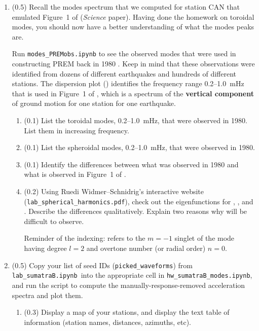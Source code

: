 \documentclass[11pt,titlepage,fleqn]{article}
\newcommand{\tfilemodes}{{\tt hw\_sumatraB\_modes.ipynb}}
\newcommand{\tfilelab}{{\tt lab\_sumatraB.ipynb}}
\begin{document}
\begin{enumerate}
\item (0.5) Recall the modes spectrum that we computed for station CAN that emulated Figure~1 of \citet{Park2005} ({\em Science} paper). Having done the homework on toroidal modes, you should now have a better understanding of what the modes peaks are.

Run \verb+modes_PREMobs.ipynb+ to see the observed modes that were used in constructing PREM back in 1980 \citep{PREM}. Keep in mind that these observations were identified from dozens of different earthquakes and hundreds of different stations.
The dispersion plot () identifies the frequency range 0.2--1.0~mHz that is used in Figure~1 of \citet{Park2005}, which is a spectrum of the {\bf vertical component} of ground motion for one station for one earthquake.
%
\begin{enumerate}
\item (0.1) List the toroidal modes, 0.2--1.0~mHz, that were observed in 1980. \\
List them in increasing frequency.
\item (0.1) List the spheroidal modes, 0.2--1.0~mHz, that were observed in 1980.
\item (0.1) Identify the differences between what was observed in 1980 and what is observed in Figure~1 of \citet{Park2005}.
\item (0.2) Using Ruedi Widmer--Schnidrig's interactive website (\verb+lab_spherical_harmonics.pdf+), check out the eigenfunctions for , , and . Describe the differences qualitatively. Explain two reasons why  will be difficult to observe.

Reminder of the indexing:  refers to the $m=-1$ singlet of the mode having degree $l=2$ and overtone number (or radial order) $n=0$.
\end{enumerate}


\item (0.5) Copy your list of seed IDs (\verb+picked_waveforms+) from \tfilelab\ into the appropriate cell in \tfilemodes, and run the script to compute the manually-response-removed acceleration spectra and plot them.
%
\begin{enumerate}
\item (0.3) %
Display a map of your stations, and display the text table of information (station names, distances, azimuths, etc).


\end{enumerate}
\end{enumerate}
\end{document}
